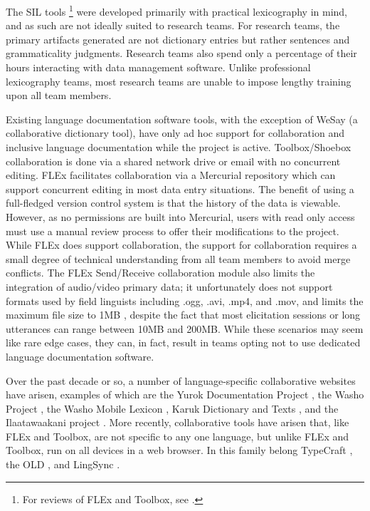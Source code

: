 \documentclass[11pt]{article}
\begin{document}
The SIL tools%
\footnote{For reviews of FLEx and Toolbox, see \cite{Butler:2007,rogers10,robinson07}.} %
were developed primarily with practical lexicography in mind, and as such are
not ideally suited to research teams. For research teams, the primary artifacts
generated are not dictionary entries but rather sentences and grammaticality
judgments. Research teams also spend only a percentage of their hours
interacting with data management software. Unlike professional lexicography
teams, most research teams are unable to impose lengthy training upon all team
members.

Existing language documentation software tools, with the exception of WeSay (a
collaborative dictionary tool), have only ad hoc support for collaboration and
inclusive language documentation while the project is active. Toolbox/Shoebox
collaboration is done via a shared network drive or email with no concurrent
editing. FLEx  facilitates collaboration via a Mercurial repository
\cite{FLExSendReceive:2013:Online} which can  support concurrent editing in
most data entry situations. The benefit of using a full-fledged version control
system is that the history of the data is viewable.  However, as no permissions
are built into Mercurial, users with read only access must use a manual review
process to offer their modifications to the project. While FLEx does support
collaboration, the support for collaboration requires a small degree of
technical understanding from all team members to avoid merge conflicts.  The
FLEx Send/Receive  collaboration module also limits the integration of
audio/video primary data; it unfortunately does not support formats used by
field linguists including .ogg, .avi, .mp4, and .mov, and limits the maximum
file size to 1MB  \cite{FLExSendReceive:2013:Online}, despite the fact that
most elicitation sessions or long utterances can range between 10MB and 200MB. 
While these scenarios may seem like rare edge cases, they can, in fact, result
in teams opting not to use dedicated language documentation software.

Over the past decade or so, a number of language-specific collaborative
websites have arisen, examples of which are the Yurok Documentation Project
\cite{Yurok:2001:Online}, the Washo Project
\cite{Washo:2005:Online,Cihlar:2008}, the Washo Mobile Lexicon
\cite{WashoMobile:2008:Online}, Karuk Dictionary and Texts
\cite{Karuk:2009:Online}, and the Ilaatawaakani project \cite{Troy:2014}. More
recently, collaborative  tools have arisen that, like FLEx and Toolbox, are not
specific to any one language, but unlike FLEx and Toolbox, run on all devices
in a web browser.  In this family belong TypeCraft \cite{Beermann:2012}, the
OLD \cite{dunham2014docs}, and LingSync \cite{lingsync:2012}.
\end{document}
